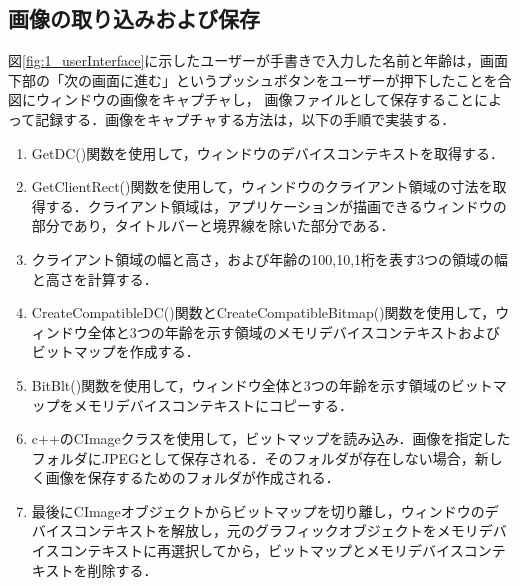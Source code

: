 \subsection{画像の取り込みおよび保存}
図\ref{fig:1_userInterface}に示したユーザーが手書きで入力した名前と年齢は，画面下部の「次の画面に進む」というプッシュボタンをユーザーが押下したことを合図にウィンドウの画像をキャプチャし，
画像ファイルとして保存することによって記録する．画像をキャプチャする方法は，以下の手順で実装する．
\begin{enumerate}[leftmargin=*]
  \item GetDC()関数を使用して，ウィンドウのデバイスコンテキストを取得する．
  \item GetClientRect()関数を使用して，ウィンドウのクライアント領域の寸法を取得する．クライアント領域は，アプリケーションが描画できるウィンドウの部分であり，タイトルバーと境界線を除いた部分である．
  \item クライアント領域の幅と高さ，および年齢の100,10,1桁を表す3つの領域の幅と高さを計算する．
  \item CreateCompatibleDC()関数とCreateCompatibleBitmap()関数を使用して，ウィンドウ全体と3つの年齢を示す領域のメモリデバイスコンテキストおよびビットマップを作成する．
  \item BitBlt()関数を使用して，ウィンドウ全体と3つの年齢を示す領域のビットマップをメモリデバイスコンテキストにコピーする．
  \item c++のCImageクラスを使用して，ビットマップを読み込み．画像を指定したフォルダにJPEGとして保存される．そのフォルダが存在しない場合，新しく画像を保存するためのフォルダが作成される．
  \item 最後にCImageオブジェクトからビットマップを切り離し，ウィンドウのデバイスコンテキストを解放し，元のグラフィックオブジェクトをメモリデバイスコンテキストに再選択してから，ビットマップとメモリデバイスコンテキストを削除する．

\end{enumerate}
